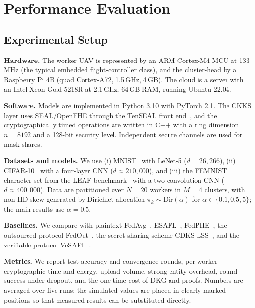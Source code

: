 \section{Performance Evaluation}
\label{sec:evaluation}

\subsection{Experimental Setup}
\label{subsec:setup}
\textbf{Hardware.} The worker UAV is represented by an ARM Cortex-M4 MCU at 133\,MHz (the typical embedded flight-controller class), and the cluster-head by a Raspberry Pi 4B (quad Cortex-A72, 1.5\,GHz, 4\,GB). The cloud is a server with an Intel Xeon Gold 5218R at 2.1\,GHz, 64\,GB RAM, running Ubuntu 22.04.

\textbf{Software.} Models are implemented in Python 3.10 with PyTorch 2.1. The CKKS layer uses SEAL/OpenFHE through the TenSEAL front end~\cite{benaissa2021tenseal}, and the cryptographically timed operations are written in C++ with a ring dimension $n=8192$ and a 128-bit security level. Independent secure channels are used for mask shares.

\textbf{Datasets and models.} We use (i) MNIST~\cite{deng2012mnist} with LeNet-5 ($d=26{,}266$), (ii) CIFAR-10~\cite{krizhevsky2009learning} with a four-layer CNN ($d\approx210{,}000$), and (iii) the FEMNIST character set from the LEAF benchmark~\cite{caldas2018leaf} with a two-convolution CNN ($d\approx400{,}000$). Data are partitioned over $N=20$ workers in $M=4$ clusters, with non-IID skew generated by Dirichlet allocation $\pi_k\sim\mathrm{Dir}(\alpha)$ for $\alpha\in\{0.1,0.5,5\}$; the main results use $\alpha=0.5$.

\textbf{Baselines.} We compare with plaintext FedAvg~\cite{mcmahan2017communication}, ESAFL~\cite{wu2025esafl}, FedPHE~\cite{li2025fedphe}, the outsourced protocol FedOut~\cite{yuan2026fedout}, the secret-sharing scheme CDKS-LSS~\cite{wang2026cdks}, and the verifiable protocol VeSAFL~\cite{bouamama2025vesafl}.

\textbf{Metrics.} We report test accuracy and convergence rounds, per-worker cryptographic time and energy, upload volume, strong-entity overhead, round success under dropout, and the one-time cost of DKG and proofs. Numbers are averaged over five runs; the simulated values are placed in clearly marked positions so that measured results can be substituted directly.

